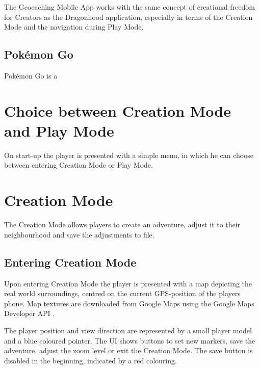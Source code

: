 \documentclass{sigchi-ext}
\begin{document}
The Geocaching Mobile App works with the same concept of creational freedom for Creators as the Dragonhood application, especially in terms of the Creation Mode and the navigation during Play Mode. 

\subsection{Pokémon Go}

Pokémon Go is a 

\section{Choice between Creation Mode and Play Mode}

On start-up the player is presented with a simple menu, in which he can choose between entering Creation Mode or Play Mode.

\section{Creation Mode} 
\label{sec:Creation}

The Creation Mode allows players to create an adventure, adjust it to their neighbourhood and save the adjustments to file.


\subsection{Entering Creation Mode}

Upon entering Creation Mode the player is presented with a map depicting the real world surroundings, centred on the current GPS-position of the players phone. Map textures are downloaded from Google Maps \cite{googlemaps} using the Google Maps Developer API \cite{googlemapsAPI}.

The player position and view direction are represented by a small player model and a blue coloured pointer. The UI shows buttons to set new markers, save the adventure, adjust the zoom level or exit the Creation Mode. The save button is disabled in the beginning, indicated by a red colouring.
\end{document}
